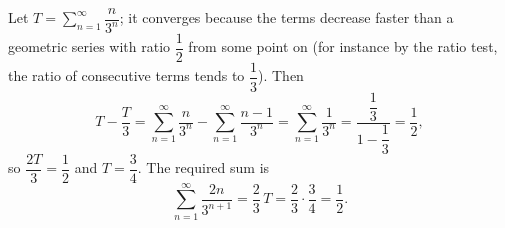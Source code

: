 Let $T=\displaystyle\sum_{n=1}^{\infty}\dfrac{n}{3^{n}}$; it converges because the terms decrease faster than a geometric series with ratio $\dfrac{1}{2}$ from some point on (for instance by the ratio test, the ratio of consecutive terms tends to $\dfrac{1}{3}$). Then
\[
T-\dfrac{T}{3}=\sum_{n=1}^{\infty}\dfrac{n}{3^n}-\sum_{n=1}^{\infty}\dfrac{n-1}{3^{n}}=\sum_{n=1}^{\infty}\dfrac{1}{3^n}=\dfrac{\dfrac{1}{3}}{1-\dfrac{1}{3}}=\dfrac{1}{2},
\]
so $\dfrac{2T}{3}=\dfrac{1}{2}$ and $T=\dfrac{3}{4}$. The required sum is
\[
\sum_{n=1}^{\infty}\dfrac{2n}{3^{n+1}}=\dfrac{2}{3}\,T=\dfrac{2}{3}\cdot\dfrac{3}{4}=\boxed{\dfrac{1}{2}}.
\]
